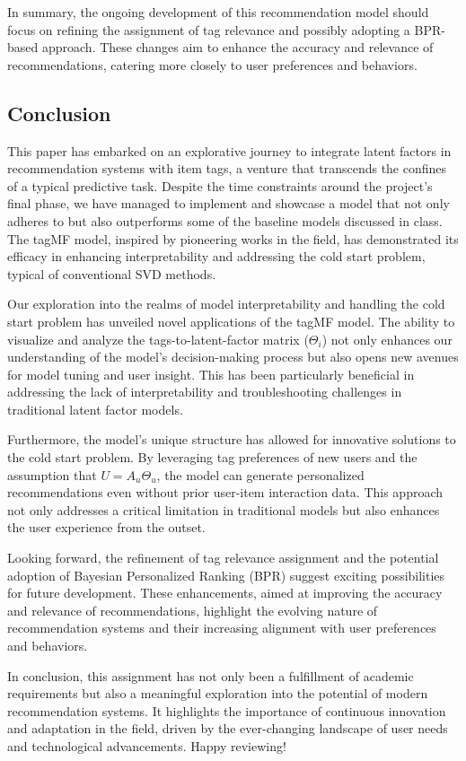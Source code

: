 \documentclass[sigplan,screen]{acmart}
\begin{document}
In summary, the ongoing development of this recommendation model should focus on refining the assignment of tag relevance and possibly adopting a BPR-based approach. These changes aim to enhance the accuracy and relevance of recommendations, catering more closely to user preferences and behaviors.

\subsection{Conclusion}

This paper has embarked on an explorative journey to integrate latent factors in recommendation systems with item tags, a venture that transcends the confines of a typical predictive task. Despite the time constraints around the project's final phase, we have managed to implement and showcase a model that not only adheres to but also outperforms some of the baseline models discussed in class. The tagMF model, inspired by pioneering works in the field\cite{LOEPP201921}, has demonstrated its efficacy in enhancing interpretability and addressing the cold start problem, typical of conventional SVD methods.

Our exploration into the realms of model interpretability and handling the cold start problem has unveiled novel applications of the tagMF model. The ability to visualize and analyze the tags-to-latent-factor matrix (\(\Theta_i\)) not only enhances our understanding of the model's decision-making process but also opens new avenues for model tuning and user insight. This has been particularly beneficial in addressing the lack of interpretability and troubleshooting challenges in traditional latent factor models.

Furthermore, the model's unique structure has allowed for innovative solutions to the cold start problem. By leveraging tag preferences of new users and the assumption that \(U = A_u\Theta_u\), the model can generate personalized recommendations even without prior user-item interaction data. This approach not only addresses a critical limitation in traditional models but also enhances the user experience from the outset.

Looking forward, the refinement of tag relevance assignment and the potential adoption of Bayesian Personalized Ranking (BPR) suggest exciting possibilities for future development. These enhancements, aimed at improving the accuracy and relevance of recommendations, highlight the evolving nature of recommendation systems and their increasing alignment with user preferences and behaviors.

In conclusion, this assignment has not only been a fulfillment of academic requirements but also a meaningful exploration into the potential of modern recommendation systems. It highlights the importance of continuous innovation and adaptation in the field, driven by the ever-changing landscape of user needs and technological advancements. Happy reviewing!






\appendix
\end{document}
